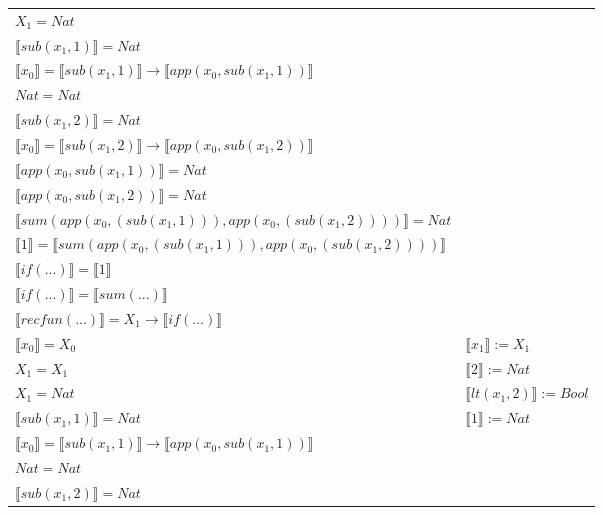 \begin{exercise}
\begin{description}
\begin{center}
\begin{longtable}[!h]{ | l | l | }
                        $X_1 = Nat$ & \\
                        $ \llbracket sub(x_1,1) \rrbracket = Nat$ & \\
                        $ \llbracket x_0 \rrbracket =  \llbracket sub(x_1,1) \rrbracket \to  \llbracket app(x_0, sub(x_1,1)) \rrbracket$ & \\
                        $Nat = Nat$ & \\
                        $ \llbracket sub(x_1,2) \rrbracket = Nat$ & \\
                        $ \llbracket x_0 \rrbracket = \llbracket sub(x_1,2) \rrbracket \to  \llbracket app(x_0, sub(x_1,2)) \rrbracket$ & \\
                        $ \llbracket app(x_0, sub(x_1,1)) \rrbracket = Nat$ & \\
                        $ \llbracket app(x_0, sub(x_1,2)) \rrbracket = Nat$ & \\
                        $ \llbracket sum(app(x_0, (sub(x_1,1))), app(x_0, (sub(x_1,2))))  \rrbracket = Nat$ & \\
                        $ \llbracket 1 \rrbracket =  \llbracket sum(app(x_0, (sub(x_1,1))), app(x_0, (sub(x_1,2)))) \rrbracket$ & \\
                        $ \llbracket if(...) \rrbracket =  \llbracket 1 \rrbracket$ & \\
                        $ \llbracket if(...) \rrbracket =  \llbracket sum(...) \rrbracket$ & \\
                        $ \llbracket recfun(...) \rrbracket =   X_1  \to  \llbracket if(...) \rrbracket $  & \\
                    \hline
                        $ \llbracket x_0 \rrbracket = X_0$ & $ \llbracket x_1 \rrbracket := X_1$ \\
                        $X_1 = X_1$ & $ \llbracket 2 \rrbracket := Nat$ \\
                        $X_1 = Nat$ & $ \llbracket lt(x_1 , 2) \rrbracket := Bool$ \\
                        $ \llbracket sub(x_1,1) \rrbracket = Nat$ & $ \llbracket 1 \rrbracket := Nat$ \\
                        $ \llbracket x_0 \rrbracket =  \llbracket sub(x_1,1) \rrbracket \to  \llbracket app(x_0, sub(x_1,1)) \rrbracket$ & \\
                        $Nat = Nat$ & \\
                        $ \llbracket sub(x_1,2) \rrbracket = Nat$ & \\

\end{longtable}
\end{center}
\end{description}
\end{exercise}
